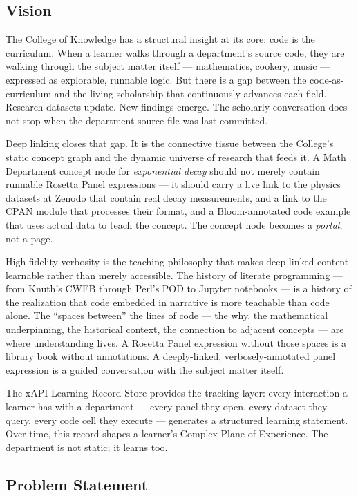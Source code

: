 \documentclass[11pt,letterpaper]{article}
\begin{document}
\subsection{Vision}

The College of Knowledge has a structural insight at its core: code is the curriculum. When a learner walks through a department's source code, they are walking through the subject matter itself --- mathematics, cookery, music --- expressed as explorable, runnable logic. But there is a gap between the code-as-curriculum and the living scholarship that continuously advances each field. Research datasets update. New findings emerge. The scholarly conversation does not stop when the department source file was last committed.

Deep linking closes that gap. It is the connective tissue between the College's static concept graph and the dynamic universe of research that feeds it. A Math Department concept node for \textit{exponential decay} should not merely contain runnable Rosetta Panel expressions --- it should carry a live link to the physics datasets at Zenodo that contain real decay measurements, and a link to the CPAN module that processes their format, and a Bloom-annotated code example that uses actual data to teach the concept. The concept node becomes a \textit{portal}, not a page.

High-fidelity verbosity is the teaching philosophy that makes deep-linked content learnable rather than merely accessible. The history of literate programming --- from Knuth's CWEB through Perl's POD to Jupyter notebooks --- is a history of the realization that code embedded in narrative is more teachable than code alone. The ``spaces between'' the lines of code --- the why, the mathematical underpinning, the historical context, the connection to adjacent concepts --- are where understanding lives. A Rosetta Panel expression without those spaces is a library book without annotations. A deeply-linked, verbosely-annotated panel expression is a guided conversation with the subject matter itself.

The xAPI Learning Record Store provides the tracking layer: every interaction a learner has with a department --- every panel they open, every dataset they query, every code cell they execute --- generates a structured learning statement. Over time, this record shapes a learner's Complex Plane of Experience. The department is not static; it learns too.

\subsection{Problem Statement}
\end{document}
